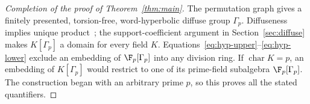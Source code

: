 \begin{proof}[Completion of the proof of Theorem~\ref{thm:main}]
The permutation graph gives a finitely presented, torsion-free,
word-hyperbolic diffuse group \(\Gamma_p\). Diffuseness implies
unique product~\cite[Proposition~1.1]{Bowditch}; the support-coefficient
argument in Section~\ref{sec:diffuse} makes \(K[\Gamma_p]\) a domain
for every field \(K\). Equations~\eqref{eq:hyp-upper}--\eqref{eq:hyp-lower}
exclude an embedding of \(\F_p[\Gamma_p]\) into any division ring.
If \(\operatorname{char}K=p\), an embedding of \(K[\Gamma_p]\) would
restrict to one of its prime-field subalgebra \(\F_p[\Gamma_p]\).
The construction began with an arbitrary prime \(p\), so this proves
all the stated quantifiers.
\end{proof}
